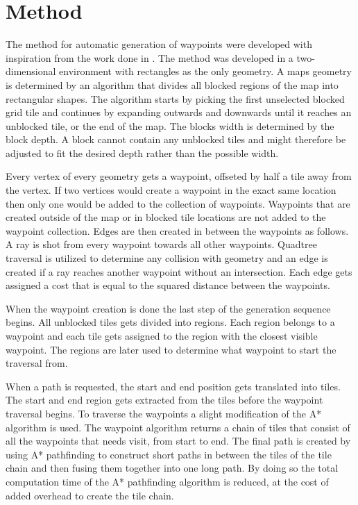 \documentclass[sigconf]{acmart}
\begin{document}
\section{Method}
The method for automatic generation of waypoints were developed with inspiration from the work done in \cite{dynaPF15}. The method was developed in a two-dimensional environment with rectangles as the only geometry. A maps geometry is determined by an algorithm that divides all blocked regions of the map into rectangular shapes. The algorithm starts by picking the first unselected blocked grid tile and continues by expanding outwards and downwards until it reaches an unblocked tile, or the end of the map. The blocks width is determined by the block depth. A block cannot contain any unblocked tiles and might therefore be adjusted to fit the desired depth rather than the possible width.

Every vertex of every geometry gets a waypoint, offseted by half a tile away from the vertex. If two vertices would create a waypoint in the exact same location then only one would be added to the collection of waypoints. Waypoints that are created outside of the map or in blocked tile locations are not added to the waypoint collection. Edges are then created in between the waypoints as follows. A ray is shot from every waypoint towards all other waypoints. Quadtree traversal is utilized to determine any collision with geometry and an edge is created if a ray reaches another waypoint without an intersection. Each edge gets assigned a cost that is equal to the squared distance between the waypoints.
	
When the waypoint creation is done the last step of the generation sequence begins. All unblocked tiles gets divided into regions. Each region belongs to a waypoint and each tile gets assigned to the region with the closest visible waypoint. The regions are later used to determine what waypoint to start the traversal from.
	
When a path is requested, the start and end position gets translated into tiles. The start and end region gets extracted from the tiles before the waypoint traversal begins. To traverse the waypoints a slight modification of the A* algorithm is used. The waypoint algorithm returns a chain of tiles that consist of all the waypoints that needs visit, from start to end. The final path is created by using A* pathfinding to construct short paths in between the tiles of the tile chain and then fusing them together into one long path. By doing so the total computation time of the A* pathfinding algorithm is reduced, at the cost of added overhead to create the tile chain.
	
\end{document}
